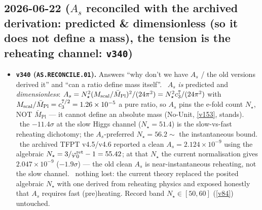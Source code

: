 \subsection*{2026-06-22 ($A_s$ reconciled with the archived derivation: predicted \& dimensionless (so it does not define a mass), the tension is the reheating channel: \texttt{v340})}
\begin{itemize}
\item \textbf{\texttt{v340} (\texttt{AS.RECONCILE.01}).} Answers ``why don't we have $A_s$ / the old versions
derived it'' and ``can a ratio define mass itself''. \mE\ $A_s$ \emph{is} predicted and \emph{dimensionless}:
$A_s=N_\star^2(M_{\mathrm{scal}}/\bar M_{\mathrm{Pl}})^2/(24\pi^2)=N_\star^2c_3^7/(24\pi^2)$ with
$M_{\mathrm{scal}}/\bar M_{\mathrm{Pl}}=c_3^{7/2}=1.26\times10^{-5}$ a pure ratio, so $A_s$ pins the e-fold
count $N_\star$, NOT $\bar M_{\mathrm{Pl}}$ --- it cannot define an absolute mass (No-Unit, \vref{v153}, stands).
\mC\ the $-11.4\sigma$ at the slow Higgs channel ($N_\star{=}51.4$) is the slow-vs-fast reheating dichotomy;
the $A_s$-preferred $N_\star{=}56.2\sim$ the instantaneous bound. \mC\ the archived TFPT v4.5/v4.6 reported a clean
$A_s=2.124\times10^{-9}$ using the algebraic $N_\star=3/\varphi_0^{\mathrm{ret}}-1=55.42$; at that $N_\star$ the current normalisation
gives $2.047\times10^{-9}$ ($-1.9\sigma$) --- the old clean $A_s$ is near-instantaneous reheating, not the slow
channel. \mE\ nothing lost: the current theory replaced the posited algebraic $N_\star$ with one derived from
reheating physics and exposed honestly that $A_s$ requires fast (pre)heating. Record band $N_\star\in[50,60]$
(\vref{v84}) untouched.
\end{itemize}

